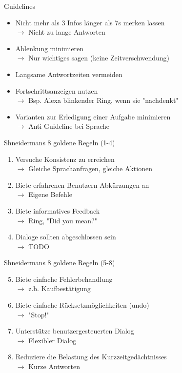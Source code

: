 \documentclass[
  10pt
, handout
]{beamer}
\begin{document}
\begin{frame}{Guidelines}
  \begin{itemize}
    \item<+-> Nicht mehr als 3 Infos länger als 7s merken lassen \\
              $\rightarrow$  Nicht zu lange Antworten
    \item<+-> Ablenkung minimieren \\ $\rightarrow$ Nur wichtiges sagen (keine Zeitverschwendung)
    \item<+-> Langsame Antwortzeiten vermeiden
    \item<+-> Fortschrittsanzeigen nutzen \\ $\rightarrow$ Bsp. Alexa blinkender Ring, wenn sie "nachdenkt"
    \item<+-> Varianten zur Erledigung einer Aufgabe minimieren \\ $\rightarrow$ Anti-Guideline bei Sprache
  \end{itemize}
\end{frame}

\begin{frame}{Shneidermans 8 goldene Regeln (1-4)}
  \begin{enumerate}
    \item<+-> Versuche Konsistenz zu erreichen \\
              $\rightarrow$ Gleiche Sprachanfragen, gleiche Aktionen
    \item<+-> Biete erfahrenen Benutzern Abkürzungen an \\
              $\rightarrow$ Eigene Befehle
    \item<+-> Biete informatives Feedback \\
              $\rightarrow$ Ring, "Did you mean?"
    \item<+-> Dialoge sollten abgeschlossen sein \\
              $\rightarrow$ TODO
  \end{enumerate}
\end{frame}

\begin{frame}{Shneidermans 8 goldene Regeln (5-8)}
  \begin{enumerate}
    \setcounter{enumi}{4}
    \item<+-> Biete einfache Fehlerbehandlung \\
              $\rightarrow$ z.b. Kaufbestätigung
    \item<+-> Biete einfache Rücksetzmöglichkeiten (undo) \\
              $\rightarrow$ "Stop!"
    \item<+-> Unterstütze benutzergesteuerten Dialog \\
              $\rightarrow$ Flexibler Dialog
    \item<+-> Reduziere die Belastung des Kurzzeitgedächtnisses \\
              $\rightarrow$ Kurze Antworten
  \end{enumerate}
\end{frame}
\end{document}
